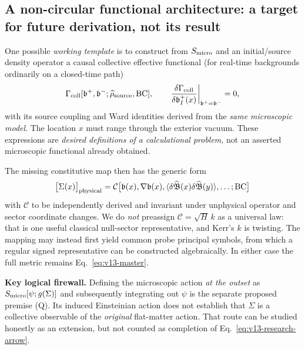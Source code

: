 \documentclass[11pt,a4paper]{article}
\begin{document}
\subsection{A non-circular functional architecture: a target for future derivation, not its result}
\label{sec:v13-functional-architecture}
One possible \emph{working template} is to construct from $S_{\rm micro}$ and an initial/source density operator a causal collective effective functional (for real-time backgrounds ordinarily on a closed-time path)
\begin{equation}\label{eq:v13-gamma-target}
\Gamma_{\rm coll}[\mathfrak b^+,\mathfrak b^-;\widehat\rho_{\rm source},\mathrm{BC}],
\qquad
\left.\frac{\delta\Gamma_{\rm coll}}{\delta\mathfrak b^+_I(x)}\right|_{\mathfrak b^+=\mathfrak b^-}=0,
\end{equation}
with its source coupling and Ward identities derived from the \emph{same microscopic model}. The location $x$ must range through the exterior vacuum. These expressions are \emph{desired definitions of a calculational problem}, not an asserted microscopic functional already obtained.

The missing constitutive map then has the generic form
\begin{equation}\label{eq:v13-constitutive-target}
\big[\Sigma(x)\big]_{\rm physical}
=\mathcal C\big[\mathfrak b(x),\nabla\mathfrak b(x),
\langle\delta\widehat{\mathfrak B}(x)\delta\widehat{\mathfrak B}(y)\rangle,\ldots;\mathrm{BC}\big]
\end{equation}
with $\mathcal C$ to be independently derived and invariant under unphysical operator and sector coordinate changes. We do \emph{not} preassign $\mathcal C=\sqrt H\,k$ as a universal law: that is one useful classical null-sector representative, and Kerr's $k$ is twisting. The mapping may instead first yield common probe principal symbols, from which a regular signed representative can be constructed algebraically. In either case the full metric remains Eq.~\eqref{eq:v13-master}.

\textbf{Key logical firewall.} Defining the microscopic action \emph{at the outset} as $S_{\rm micro}[\psi;g(\Sigma)]$ and subsequently integrating out $\psi$ is the separate proposed premise (Q). Its induced Einsteinian action does not establish that $\Sigma$ is a collective observable of the \emph{original} flat-matter action. That route can be studied honestly as an extension, but not counted as completion of Eq.~\eqref{eq:v13-research-arrow}.
\end{document}
